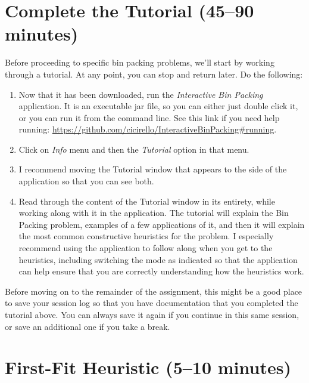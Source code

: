\documentclass[11pt,letterpaper]{article}
\begin{document}
\section{Complete the Tutorial (45--90 minutes)}\label{sec:tutorial}
Before proceeding to specific bin packing problems, we'll start
by working through a tutorial. At any point, you can stop and return 
later. Do the following:
\begin{enumerate}[leftmargin=*, parsep=0pt, itemsep=2pt, topsep=2pt]
\item Now that it has been downloaded, run the {\em Interactive Bin Packing}
application. It is an executable jar file, so you can either just double click
it, or you can run it from the command line.  See this link if you need
help running: \url{https://github.com/cicirello/InteractiveBinPacking#running}.
\item Click on {\em Info} menu and then the {\em Tutorial} option in that menu.
\item I recommend moving the Tutorial window that appears to the 
side of the application so that you can see both.
\item Read through the content of the Tutorial window in its 
entirety, while working along with it in the application. The tutorial 
will explain the Bin Packing problem, examples of a few applications 
of it, and then it will explain the most common constructive heuristics 
for the problem. I especially recommend using the application to 
follow along when you get to the heuristics, including switching the mode
as indicated so that the application can help ensure that you are 
correctly understanding how the heuristics work.
\end{enumerate}

Before moving on to the remainder of the assignment, this might
be a good place to save your session log so that you have documentation
that you completed the tutorial above.  You can always save it again
if you continue in this same session, or save an additional one if
you take a break.


\newpage

\section{First-Fit Heuristic (5--10 minutes)}\label{sec:ff}

\end{document}
